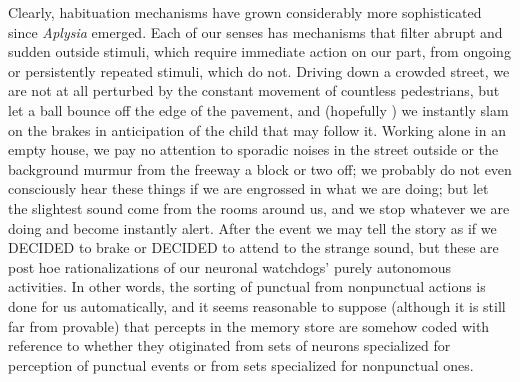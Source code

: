 Clearly, habituation mechanisms have grown considerably more sophisticated since \textit{Aplysia} emerged. Each of our senses has mechanisms that filter abrupt and sudden outside stimuli, which require immediate action on our part, from ongoing or persistently repeated stimuli, which do not. Driving down a crowded street, we are not at all perturbed by the constant movement of countless pedestrians, but let a ball bounce off the edge of the pavement, and (hopefully ) we instantly slam on the brakes in anticipation of the child that may follow it. Working alone in an empty house, we pay no attention to sporadic noises in the street outside or the background murmur from the freeway a block or two off; we probably do not even consciously hear these things if we are engrossed in what we are doing; but let the slightest sound come from the rooms around us, and we stop whatever we are doing and become instantly alert. After the event we may tell the story as if we DECIDED to brake or DECIDED to attend to the strange sound, but these are post hoe rationalizations of our neuronal watchdogs' purely autono\-mous activities. In other words, the sorting of punctual from non\-punctual actions is done for us automatically, and it seems reasonable to suppose (although it is still far from provable) that percepts in the memory store are somehow coded with reference to whether they otiginated from sets of neurons specialized for perception of punctual events or from sets specialized for nonpunctual ones.

